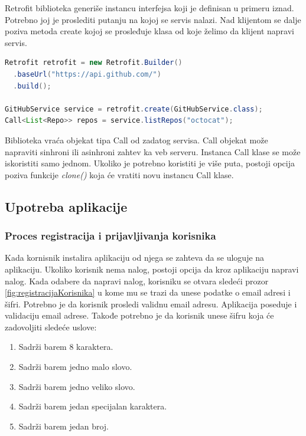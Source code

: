 \documentclass[12pt,oneside]{memoir}
\begin{document}
Retrofit biblioteka generiše instancu interfejsa koji je definisan u primeru iznad. Potrebno joj je proslediti putanju na kojoj se servis nalazi. Nad klijentom se dalje poziva metoda create kojoj se prosleđuje klasa od koje želimo da klijent napravi servis.
\begin{lstlisting}[caption={Inicijalizacija Retrofit klijenta i primer korišćenja},captionpos=t, language=Java]
Retrofit retrofit = new Retrofit.Builder()
  .baseUrl("https://api.github.com/")
  .build();

GitHubService service = retrofit.create(GitHubService.class);
Call<List<Repo>> repos = service.listRepos("octocat");
\end{lstlisting}


Biblioteka vraća objekat tipa Call od zadatog servisa. Call objekat može napraviti sinhroni ili asinhroni zahtev ka veb serveru. Instanca Call klase se može iskoristiti samo jednom. Ukoliko je potrebno koristiti je više puta, postoji opcija poziva funkcije \emph{clone()} koja će vratiti novu instancu Call klase.
 
\subsection{Upotreba aplikacije}
 
\subsubsection{Proces registracija i prijavljivanja korisnika}
 
Kada kornisnik instalira aplikaciju od njega se zahteva da se uloguje na aplikaciju. Ukoliko korisnik nema nalog, postoji opcija da kroz aplikaciju napravi nalog. Kada odabere da napravi nalog, korisniku se otvara sledeći prozor \ref{fig:registracijaKorisnika} u kome mu se trazi da unese podatke o email adresi i šifri. Potrebno je da korisnik prosledi validnu email adresu. Aplikacija poseduje i validaciju email adrese. Takođe potrebno je da korisnik unese šifru koja će zadovoljiti sledeće uslove:

\begin{enumerate}
  \item Sadrži barem 8 karaktera.
  \item Sadrži barem jedno malo slovo.
  \item Sadrži barem jedno veliko slovo.
  \item Sadrži barem jedan specijalan karaktera.
  \item Sadrži barem jedan broj.
\end{enumerate}
 
\end{document}
